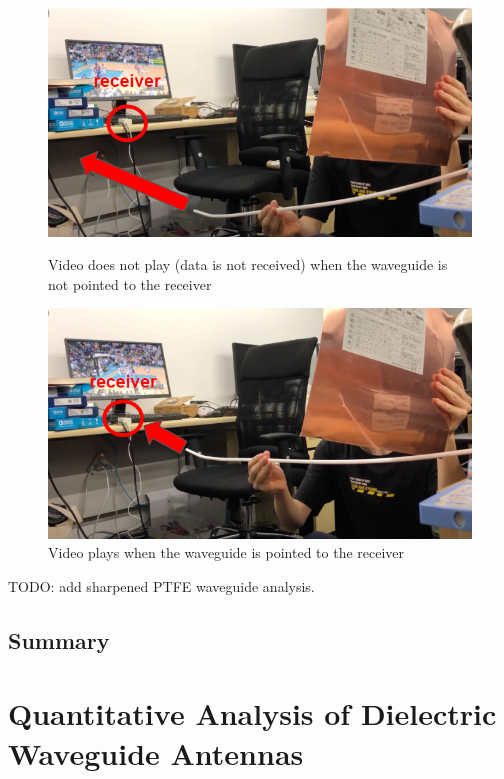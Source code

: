 \documentclass[a4paper,12pt]{report}
\begin{document}
\begin{figure}
  \centering
  \begin{minipage}{0.45\textwidth}
    \centering
    \includegraphics[clip, keepaspectratio, width=0.9\linewidth]{img/qualitative_waveguide_not_pointed.png}
    \caption{Video does not play (data is not received) when the waveguide is not pointed to the receiver}
    \label{img:qualitative_waveguide_not_pointed}
  \end{minipage}\hfill
  \begin{minipage}{0.45\textwidth}
    \centering
    \includegraphics[clip, keepaspectratio, width=0.9\linewidth]{img/qualitative_waveguide_pointed.png}
    \caption{Video plays when the waveguide is pointed to the receiver}
    \label{img:qualitative_waveguide_pointed}
  \end{minipage}\hfill
\end{figure}

TODO: add sharpened PTFE waveguide analysis.

\section{Summary}


\chapter{Quantitative Analysis of Dielectric Waveguide Antennas}
\end{document}
